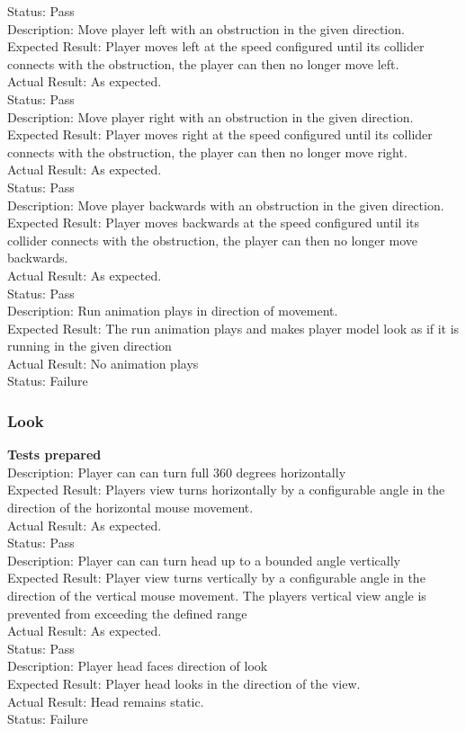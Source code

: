 \documentclass[11pt,a4paper]{article}
\begin{document}
Status: Pass
\smallskip\\
Description: Move player left with an obstruction in the given direction.\\
Expected Result: Player moves left at the speed configured until its collider connects with the obstruction, the player can then no longer move left.\\
Actual Result: As expected.\\
Status: Pass
\smallskip\\
Description: Move player right with an obstruction in the given direction.\\
Expected Result: Player moves right at the speed configured until its collider connects with the obstruction, the player can then no longer move right.\\
Actual Result: As expected.\\
Status: Pass
\smallskip\\
Description: Move player backwards with an obstruction in the given direction.\\
Expected Result: Player moves backwards at the speed configured until its collider connects with the obstruction, the player can then no longer move backwards.\\
Actual Result: As expected.\\
Status: Pass
\smallskip\\
Description: Run animation plays in direction of movement.\\
Expected Result: The run animation plays and makes player model look as if it is running in the given direction\\
Actual Result: No animation plays\\
Status: Failure
\subsubsection{Look}
\textbf{Tests prepared}\\
Description: Player can can turn full 360 degrees horizontally\\
Expected Result: Players view turns horizontally by a configurable angle in the direction of the horizontal mouse movement.\\
Actual Result: As expected.\\
Status: Pass
\smallskip\\
Description: Player can can turn head up to a bounded angle vertically\\
Expected Result: Player view turns vertically by a configurable angle in the direction of the vertical mouse movement. The players vertical view angle is prevented from exceeding the defined range\\
Actual Result: As expected.\\
Status: Pass
\smallskip\\
Description: Player head faces direction of look\\
Expected Result: Player head looks in the direction of the view.\\
Actual Result:  Head remains static.\\
Status: Failure
\end{document}

